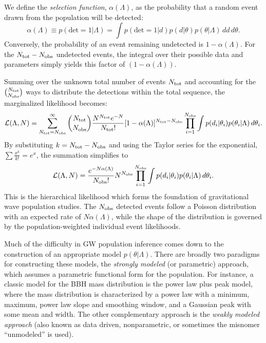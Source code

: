 \begin{refsection}
We define the \textit{selection function}, $\alpha(\Lambda)$, as the probability that a random event drawn from the population will be detected:
\begin{equation}
    \alpha(\Lambda) \equiv p(\text{det}=1 | \Lambda) = \int p(\text{det}=1 | d) p(d | \theta) p(\theta | \Lambda) \, dd \, d\theta.
\end{equation}
Conversely, the probability of an event remaining undetected is $1 - \alpha(\Lambda)$. For the $N_{\rm tot} - N_{\rm obs}$ undetected events, the integral over their possible data and parameters simply yields this factor of $(1 - \alpha(\Lambda))$.

Summing over the unknown total number of events $N_{\rm tot}$ and accounting for the $\binom{N_{\rm tot}}{N_{\rm obs}}$ ways to distribute the detections within the total sequence, the marginalized likelihood becomes:
\begin{equation}
    \mathcal{L}(\Lambda, N) = \sum_{N_{\rm tot}=N_{\rm obs}}^{\infty} \binom{N_{\rm tot}}{N_{\rm obs}} \frac{N^{N_{\rm tot}} e^{-N}}{N_{\rm tot}!} [1 - \alpha(\Lambda)]^{N_{\rm tot} - N_{\rm obs}} \prod_{i=1}^{N_{\rm obs}} \int p(d_i | \theta_i) p(\theta_i | \Lambda) \, d\theta_i.
\end{equation}
By substituting $k = N_{\rm tot} - N_{\rm obs}$ and using the Taylor series for the exponential, $\sum \frac{x^k}{k!} = e^x$, the summation simplifies to \citep{Mandel:2018mve, Vitale:2020aaz, Essick:2023upv}
\begin{equation}
    \mathcal{L}(\Lambda, N) = \frac{e^{-N\alpha(\Lambda)}}{N_{\rm obs}!} N^{N_{\rm obs}} \prod_{i=1}^{N_{\rm obs}} \int p(d_i | \theta_i) p(\theta_i | \Lambda) \, d\theta_i.
    \label{eq: intro HBI likelihood}
\end{equation}
This is the hierarchical likelihood which forms the foundation of gravitational wave population studies. The $N_{\rm obs}$ detected events follow a Poisson distribution with an expected rate of $N\alpha(\Lambda)$, while the shape of the distribution is governed by the population-weighted individual event likelihoods.


Much of the difficulty in \ac{GW} population inference comes down to the construction of an appropriate model $p(\theta | \Lambda)$. There are broadly two paradigms for constructing these models, the \textit{strongly modeled} (or parametric) approach, which assumes a parametric functional form for the population. For instance, a classic model for the \ac{BBH} mass distribution is the power law plus peak model, where the mass distribution is characterized by a power law with a minimum, maximum, power law slope and smoothing window, and a Gaussian peak with some mean and width. The other complementary approach is the \textit{weakly modeled approach} (also known as data driven, nonparametric, or sometimes the misnomer ``unmodeled'' is used). 


\end{refsection}
